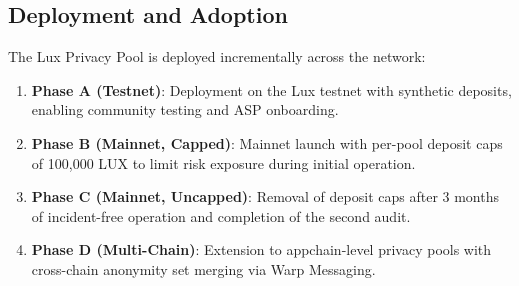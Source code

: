 \documentclass[11pt,a4paper]{article}
\begin{document}
\subsection{Deployment and Adoption}

The Lux Privacy Pool is deployed incrementally across the network:

\begin{enumerate}
    \item \textbf{Phase A (Testnet)}: Deployment on the Lux testnet with synthetic deposits, enabling community testing and ASP onboarding.
    \item \textbf{Phase B (Mainnet, Capped)}: Mainnet launch with per-pool deposit caps of 100,000 LUX to limit risk exposure during initial operation.
    \item \textbf{Phase C (Mainnet, Uncapped)}: Removal of deposit caps after 3 months of incident-free operation and completion of the second audit.
    \item \textbf{Phase D (Multi-Chain)}: Extension to appchain-level privacy pools with cross-chain anonymity set merging via Warp Messaging.
\end{enumerate}
\end{document}
